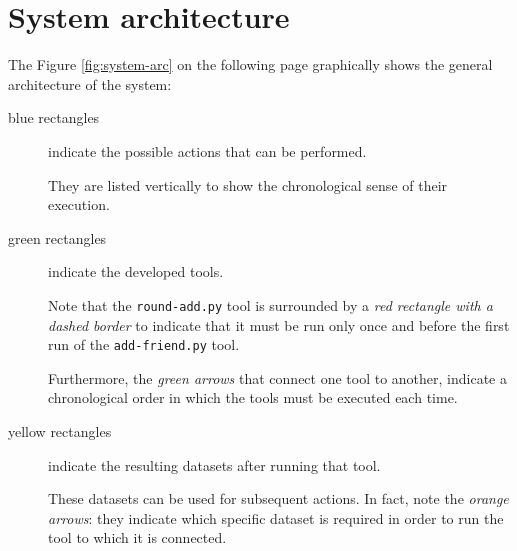 \section{System architecture}
The Figure \ref{fig:system-arc} on the following page graphically shows the general architecture of the system:
\begin{description}
	\item[blue rectangles] indicate the possible actions that can be performed.\par \noindent They are listed vertically to show the chronological sense of their execution.
	\item[green rectangles] indicate the developed tools.\par \noindent Note that the \texttt{round-add.py} tool is surrounded by a \textit{red rectangle with a dashed border} to indicate that it must be run only once and before the first run of the \texttt{add-friend.py} tool. \par \noindent Furthermore, the \textit{green arrows} that connect one tool to another, indicate a chronological order in which the tools must be executed each time.
	\item[yellow rectangles] indicate the resulting datasets after running that tool.\par \noindent These datasets can be used for subsequent actions. In fact, note the \textit{orange arrows}: they indicate which specific dataset is required in order to run the tool to which it is connected.
\end{description}
\newpage
